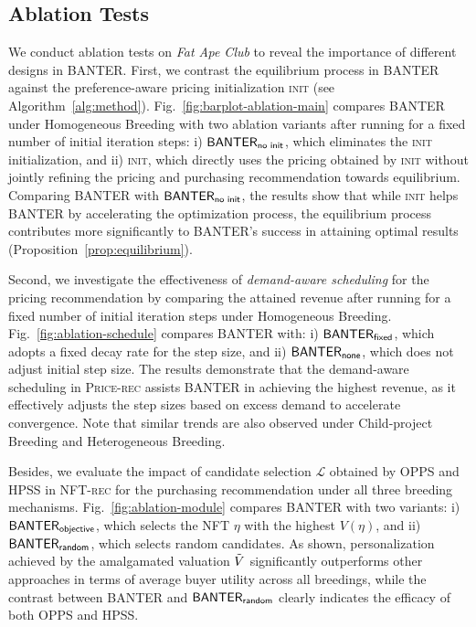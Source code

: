 \documentclass[conference]{IEEEtran}
\newcommand{\1}[1]{\mathds{1}\left[#1\right]}
\theoremstyle{plain}
\newcommand{\method}{\textsf{BANTER}\xspace}
\newcommand{\homos}{OPPS\xspace}
\newcommand{\heters}{HPSS\xspace}
\newcommand{\homob}{Homogeneous Breeding\xspace}
\newcommand{\heterb}{Heterogeneous Breeding\xspace}
\newcommand{\childb}{Child-project Breeding\xspace}
\newcommand{\finddemand}{\textsc{NFT-rec}\xspace}
\newcommand{\findprice}{\textsc{Price-rec}\xspace}
\newcommand{\bin}[1]{}
\begin{document}
\subsection{Ablation Tests}
\label{subsec:ablation_tests}
We conduct ablation tests on \textit{Fat Ape Club} to reveal the importance of different designs in \method. First, we contrast the equilibrium process in \textsf{\method} against the preference-aware pricing initialization \textsc{init} (see Algorithm~\ref{alg:method}). Fig.~\ref{fig:barplot-ablation-main} compares \textsf{\method} under \homob with two ablation variants after running for a fixed number of initial iteration steps: i) $\textsf{\method}_{\textsf{no init}}$, which eliminates the \textsc{init} initialization, and ii) \textsc{init}, which directly uses the pricing obtained by \textsc{init} without jointly refining the pricing and purchasing recommendation towards equilibrium. Comparing \textsf{\method} with $\textsf{\method}_{\textsf{no init}}$, the results show that while \textsc{init} helps \textsf{\method} by accelerating the optimization process, the equilibrium process contributes more significantly to \textsf{\method}'s success in attaining optimal results (Proposition~\ref{prop:equilibrium}). 

Second, we investigate the effectiveness of \textit{demand-aware scheduling} for the pricing recommendation by comparing the attained revenue after running for a fixed number of initial iteration steps under \homob. Fig.~\ref{fig:ablation-schedule} compares \textsf{\method} with: i) $\textsf{\method}_{\textsf{fixed}}$, which adopts a fixed decay rate for the step size, and ii) $\textsf{\method}_{\textsf{none}}$, which does not adjust initial step size\bin{(obtained through a hyperparameter grid search)}. The results demonstrate that the demand-aware scheduling in \findprice assists \textsc{\method} in achieving the highest revenue, as it effectively adjusts the step sizes based on excess demand to accelerate convergence. Note that similar trends are also observed under \childb and \heterb. 

Besides, we evaluate the impact of candidate selection $\mathcal{L}$ obtained by \homos and \heters in \finddemand for the purchasing recommendation under all three breeding mechanisms. Fig.~\ref{fig:ablation-module} compares \textsf{\method} with two variants: i) $\textsf{\method}_{\textsf{objective}}$, which selects the NFT $\eta$ with the highest $V(\eta)$, and ii) $\textsf{\method}_{\textsf{random}}$, which selects random candidates\bin{ for $\mathcal{L}$}. As shown, personalization achieved by\bin{sampling candidates with} the amalgamated valuation $\Tilde{V}$ significantly outperforms other approaches in terms of average buyer utility across all breedings, while the contrast between \textsf{\method} and $\textsf{\method}_{\textsf{random}}$ clearly indicates the efficacy of both \homos and \heters.
\end{document}
